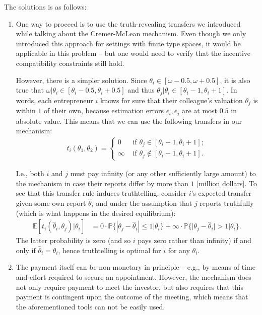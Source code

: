 \documentclass[a4paper]{article}
\begin{document}
	The solutions is as follows:
	\begin{enumerate}
		\item One way to proceed is to use the truth-revealing transfers we introduced while talking about the Cremer-McLean mechanism. Even though we only introduced this approach for settings with finite type spaces, it would be applicable in this problem -- but one would need to verify that the incentive compatibility constraints still hold.
		
		However, there is a simpler solution. Since $\theta_i \in [ \omega-0.5, \omega+0.5]$, it is also true that $\omega|\theta_i \in [\theta_i-0.5, \theta_i+0.5]$ and thus $\theta_j|\theta_i \in [\theta_i-1, \theta_i+1]$. In words, each entrepreneur $i$ knows for sure that their colleague's valuation $\theta_j$ is within $1$ of their own, because estimation errors $\epsilon_i,\epsilon_j$ are at most $0.5$ in absolute value. This means that we can use the following transfers in our mechanism:
		\begin{align*}
			t_i(\theta_1,\theta_2) = 
			\begin{cases}
				0 & \text{ if } \theta_j \in [\theta_i-1,\theta_i+1];
				\\
				\infty & \text{ if } \theta_j \notin [\theta_i-1,\theta_i+1].
			\end{cases}
		\end{align*}
		
		I.e., both $i$ and $j$ must pay infinity (or any other sufficiently large amount) to the mechanism in case their reports differ by more than $1$ [million dollars]. To see that this transfer rule induces truthtelling, consider $i$'s expected transfer given some own report $\hat{\theta}_i$ and under the assumption that $j$ reports truthfully (which is what happens in the desired equilibrium):
		\begin{align*}
			\mathbb{E} [t_i(\hat{\theta}_i,\theta_j) | \theta_i] &= 0 \cdot \mathbb{P} \{ |\theta_j-\hat{\theta}_i| \leq 1 | \theta_i \} + \infty \cdot \mathbb{P} \{ |\theta_j-\hat{\theta}_i| > 1 | \theta_i \}.
		\end{align*}
		The latter probability is zero (and so $i$ pays zero rather than infinity) if and only if $\hat{\theta}_i = \theta_i$, hence truthtelling is optimal for $i$ for any $\theta_i$.
		
		\item The payment itself can be non-monetary in principle -- e.g., by means of time and effort required to secure an appointment. However, the mechanism does not only require payment to meet the investor, but also requires that this payment is contingent upon the outcome of the meeting, which means that the aforementioned tools can not be easily used. 
		

\end{enumerate}
\end{document}
